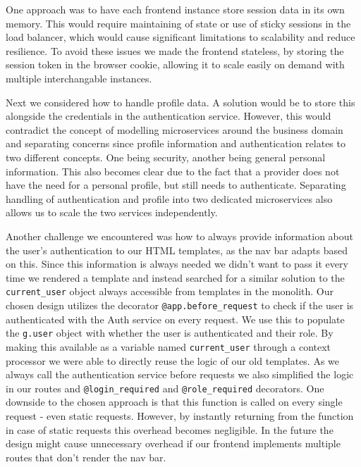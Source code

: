 One approach was to have each frontend instance store session data in its own memory. This would require maintaining of state
or use of sticky sessions in the load balancer, which would cause significant limitations to scalability and reduce resilience.
To avoid these issues we made the frontend stateless, by storing the session token in the browser cookie, 
allowing it to scale easily on demand with multiple interchangable instances.

Next we considered how to handle profile data. A solution would be to store this alongside the credentials in the authentication service.
However, this would contradict the concept of modelling microservices around the business domain and separating concerns since profile information and 
authentication relates to two different concepts. One being security, another being general personal information.
This also becomes clear due to the fact that a provider does not have the need for a personal profile, but still needs to authenticate.
Separating handling of authentication and profile into two dedicated microservices also allows us to scale the two services independently.

Another challenge we encountered was how to always provide information about the user's authentication to our HTML templates, as the nav bar adapts based on this.
Since this information is always needed we didn't want to pass it every time we rendered a template and instead searched for a similar
solution to the \texttt{current\_user} object always accessible from templates in the monolith.
Our chosen design utilizes the decorator \texttt{@app.before\_request} to check if the user is authenticated with the Auth service on every request. 
We use this to populate the \texttt{g.user} object with whether the user is authenticated and their role. By making this available as a variable named 
\texttt{current\_user} through a context processor we were able to directly reuse the logic of our old templates.
As we always call the authentication service before requests we also simplified the logic in our routes and \texttt{@login\_required} and \texttt{@role\_required} decorators.
One downside to the chosen approach is that this function is called on every single request - even static requests. 
However, by instantly returning from the function in case of static requests this overhead becomes negligible. 
In the future the design might cause unnecessary overhead if our frontend implements multiple routes that don't render the nav bar.

